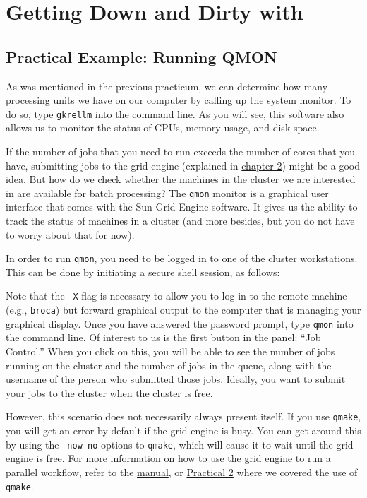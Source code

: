 \chapter{Getting Down and Dirty with \maken{}}
\label{practicum3}

\section{Practical Example: Running QMON}
As was mentioned in the previous practicum, we can determine how many processing units we have on our computer by calling up the system monitor. To do so, type \texttt{gkrellm} into the command line. As you will see, this software also allows us to monitor the status of CPUs, memory usage, and disk space. 

If the number of jobs that you need to run exceeds the number of cores that you have, submitting jobs to the grid engine (explained in \hyperref[sec:gridengine]{chapter 2}) might be a good idea. But how do we check whether the machines in the cluster we are interested in are available for batch processing? The \texttt{qmon} monitor is a graphical user interface that comes with the Sun Grid Engine software. It gives us the ability to track the status of machines in a cluster (and more besides, but you do not have to worry about that for now). 

In order to run \texttt{qmon}, you need to be logged in to one of the cluster workstations. This can be done by initiating a secure shell session, as follows:

Note that the \texttt{-X} flag is necessary to allow you to log in to the remote machine (e.g., \texttt{broca}) but forward graphical output to the computer that is managing your graphical display. Once you have answered the password prompt, type \texttt{qmon} into the command line. Of interest to us is the first button in the panel: ``Job Control.'' When you click on this, you will be able to see the number of jobs running on the cluster and the number of jobs in the queue, along with the username of the person who submitted those jobs. Ideally, you want to submit your jobs to the cluster when the cluster is free. 

However, this scenario does not necessarily always present itself. If you use \texttt{qmake}, you will get an error by default if the grid engine is busy. You can get around this by using the \texttt{-now no} options to \texttt{qmake}, which will cause it to wait until the grid engine is free. For more information on how to use the grid engine to run a parallel \maken{} workflow, refer to the \hyperref[sec:gridengine]{manual}, or \hyperref[practicum2]{Practical 2} where we covered the use of \texttt{qmake}. 

